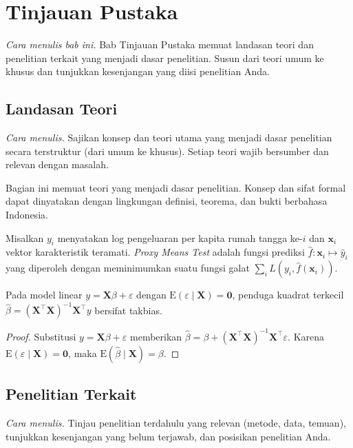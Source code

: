\chapter{Tinjauan Pustaka}
\emph{Cara menulis bab ini.} Bab Tinjauan Pustaka memuat landasan teori dan penelitian terkait yang menjadi dasar penelitian. Susun dari teori umum ke khusus dan tunjukkan kesenjangan yang diisi penelitian Anda.


\section{Landasan Teori}
\emph{Cara menulis.} Sajikan konsep dan teori utama yang menjadi dasar penelitian secara terstruktur (dari umum ke khusus). Setiap teori wajib bersumber dan relevan dengan masalah.

Bagian ini memuat teori yang menjadi dasar penelitian. Konsep dan sifat formal
dapat dinyatakan dengan lingkungan definisi, teorema, dan bukti berbahasa Indonesia.

\begin{definisi}
Misalkan $y_i$ menyatakan log pengeluaran per kapita rumah tangga ke-$i$ dan
$\mathbf{x}_i$ vektor karakteristik teramati. \emph{Proxy Means Test} adalah fungsi
prediksi $\hat{f}:\mathbf{x}_i \mapsto \hat{y}_i$ yang diperoleh dengan meminimumkan
suatu fungsi galat $\sum_i L\!\left(y_i,\hat{f}(\mathbf{x}_i)\right)$.
\end{definisi}

\begin{teorema}\label{teo:ols}
Pada model linear $y = \mathbf{X}\beta + \varepsilon$ dengan
$\mathrm{E}(\varepsilon \mid \mathbf{X}) = \mathbf{0}$, penduga kuadrat terkecil
$\hat{\beta} = (\mathbf{X}^\top\mathbf{X})^{-1}\mathbf{X}^\top y$ bersifat takbias.
\end{teorema}

\begin{proof}
Substitusi $y = \mathbf{X}\beta + \varepsilon$ memberikan
$\hat{\beta} = \beta + (\mathbf{X}^\top\mathbf{X})^{-1}\mathbf{X}^\top\varepsilon$.
Karena $\mathrm{E}(\varepsilon \mid \mathbf{X}) = \mathbf{0}$, maka
$\mathrm{E}(\hat{\beta} \mid \mathbf{X}) = \beta$.
\end{proof}

\section{Penelitian Terkait}
\emph{Cara menulis.} Tinjau penelitian terdahulu yang relevan (metode, data, temuan), tunjukkan kesenjangan yang belum terjawab, dan posisikan penelitian Anda.

